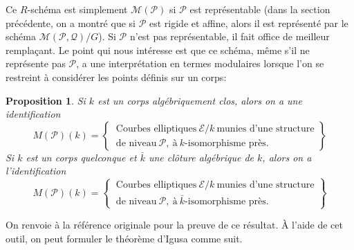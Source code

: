 \documentclass[11pt,a4paper]{article}
\newcommand{\E}{\mathcal{E}}
\renewcommand{\Pr}{\mathcal{P}}
\newcommand{\Qr}{\mathcal{Q}}
\newcommand{\M}{\mathcal{M}}
\newcommand{\vers}{\longrightarrow}
\newcommand{\Spec}{\mathrm{Spec}\,}
\newtheorem*{lem}{Lemme}
\newtheorem*{prop}{Proposition}
\theoremstyle{definition}
\begin{document}
Ce $R$-schéma est simplement $\M(\Pr)$ si $\Pr$ est représentable (dans la section précédente, on a montré que si $\Pr$ est rigide et affine, alors il est représenté par le schéma $\M(\Pr,\Qr)/G$). Si $\Pr$ n'est pas représentable, il fait office de meilleur remplaçant. Le point qui nous intéresse est que ce schéma, même s'il ne représente pas $\Pr$, a une interprétation en termes modulaires lorsque l'on se restreint à considérer les points définis sur un corps:

\begin{prop}
Si $k$ est un corps algébriquement clos, alors on a une identification
$$ M(\Pr)(k) = 
\left.
\begin{cases}
\ \text{Courbes\ elliptiques}\ \E/k \ \text{munies\ d'une\ structure} \\
\ \text{de\ niveau}\ \Pr,\ \text{à}\ k\text{-isomorphisme\ près}.
\end{cases}
\right\}$$
Si $k$ est un corps quelconque et $\bar{k}$ une clôture algébrique de $k$, alors on a l'identification
$$ M(\Pr)(k) = 
\left.
\begin{cases}
\ \text{Courbes\ elliptiques}\ \E/k \ \text{munies\ d'une\ structure} \\
\ \text{de\ niveau}\ \Pr,\ \text{à}\ \bar{k}\text{-isomorphisme\ près}.
\end{cases}
\right\}$$
\end{prop}
%
%
%
%
On renvoie à la référence originale \cite{KaMa} pour la preuve de ce résultat. À l'aide de cet outil, on peut formuler le théorème d'Igusa comme suit.
\end{document}

